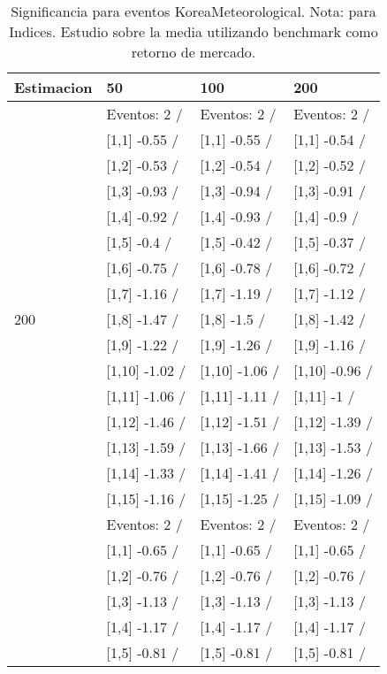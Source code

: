 \begin{table}

\caption{Significancia para eventos KoreaMeteorological. Nota: para Indices. Estudio sobre la media utilizando benchmark como retorno de mercado.}
\centering
\begin{tabular}[t]{llll}
\toprule
Estimacion & 50 & 100 & 200\\
\midrule
 & Eventos:  2 / & Eventos:  2 / & Eventos:  2 /\\
 & {}[1,1] -0.55  / & {}[1,1] -0.55  / & {}[1,1] -0.54  /\\
 & {}[1,2] -0.53  / & {}[1,2] -0.54  / & {}[1,2] -0.52  /\\
 & {}[1,3] -0.93  / & {}[1,3] -0.94  / & {}[1,3] -0.91  /\\
 & {}[1,4] -0.92  / & {}[1,4] -0.93  / & {}[1,4] -0.9  /\\
\addlinespace
 & {}[1,5] -0.4  / & {}[1,5] -0.42  / & {}[1,5] -0.37  /\\
 & {}[1,6] -0.75  / & {}[1,6] -0.78  / & {}[1,6] -0.72  /\\
 & {}[1,7] -1.16  / & {}[1,7] -1.19  / & {}[1,7] -1.12  /\\
200 & {}[1,8] -1.47  / & {}[1,8] -1.5  / & {}[1,8] -1.42  /\\
 & {}[1,9] -1.22  / & {}[1,9] -1.26  / & {}[1,9] -1.16  /\\
\addlinespace
 & {}[1,10] -1.02  / & {}[1,10] -1.06  / & {}[1,10] -0.96  /\\
 & {}[1,11] -1.06  / & {}[1,11] -1.11  / & {}[1,11] -1  /\\
 & {}[1,12] -1.46  / & {}[1,12] -1.51  / & {}[1,12] -1.39  /\\
 & {}[1,13] -1.59  / & {}[1,13] -1.66  / & {}[1,13] -1.53  /\\
 & {}[1,14] -1.33  / & {}[1,14] -1.41  / & {}[1,14] -1.26  /\\
\addlinespace
 & {}[1,15] -1.16  / & {}[1,15] -1.25  / & {}[1,15] -1.09  /\\
 & Eventos:  2 / & Eventos:  2 / & Eventos:  2 /\\
 & {}[1,1] -0.65  / & {}[1,1] -0.65  / & {}[1,1] -0.65  /\\
 & {}[1,2] -0.76  / & {}[1,2] -0.76  / & {}[1,2] -0.76  /\\
 & {}[1,3] -1.13  / & {}[1,3] -1.13  / & {}[1,3] -1.13  /\\
\addlinespace
 & {}[1,4] -1.17  / & {}[1,4] -1.17  / & {}[1,4] -1.17  /\\
 & {}[1,5] -0.81  / & {}[1,5] -0.81  / & {}[1,5] -0.81  /\\

\end{tabular}
\end{table}

